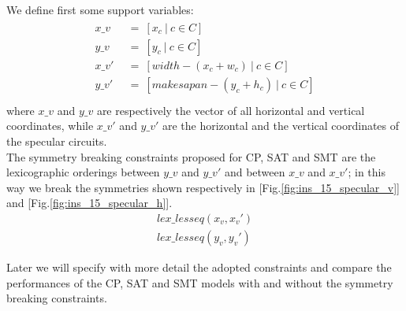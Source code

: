         We define first some support variables:
        \begin{align}
            \label{eq:specular_coord}
            \begin{split}
                x\_v\   &\ =\ [x_c\ |\ c \in C]                     \\
                y\_v\   &\ =\ [y_c\ |\ c \in C]                     \\
                x\_v'\  &\ =\ [width - (x_c + w_c)\ |\ c \in C]     \\
                y\_v'\  &\ =\ [makesapan - (y_c + h_c)\ |\ c \in C] \\                
            \end{split} 
        \end{align}
        where $x\_v$ and $y\_v$ are respectively the vector of all horizontal and vertical coordinates,
        while $x\_v'$ and $y\_v'$ are the horizontal and the vertical coordinates of the specular circuits.\\

        The symmetry breaking constraints proposed for CP, SAT and SMT are the lexicographic orderings
        between $y\_v$ and $y\_v'$ and between $x\_v$ and $x\_v'$; in this way we break the 
        symmetries shown respectively in [Fig.\ref{fig:ins_15_specular_v}] and [Fig.\ref{fig:ins_15_specular_h}].
        \begin{align*}
            lex\_lesseq(x_v, x_v') \\
            lex\_lesseq(y_v, y_v')
        \end{align*}

        Later we will specify with more detail the adopted constraints and compare the performances of the 
        CP, SAT and SMT models with and without the symmetry breaking constraints.
